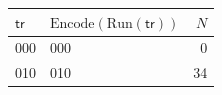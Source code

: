 \begin{tabular}{l l r}%
\hline%
\textbf{$\mathsf{tr}$}&\textbf{$\mathrm{Encode}(\mathrm{Run}(\mathsf{tr}))$}&\textbf{$N$}\\%
\hline%
000&000&0\\%
010&010&34\\%
\hline%
\end{tabular}
